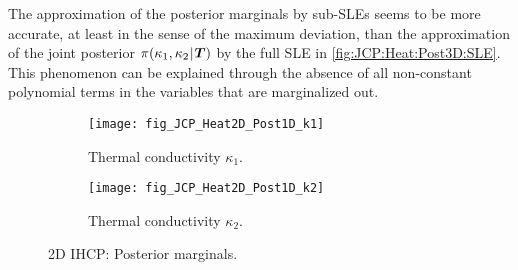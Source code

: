 The approximation of the posterior marginals by sub-SLEs seems to be more accurate, at least in the sense of the maximum deviation,
than the approximation of the joint posterior \(\pi(\kappa_1,\kappa_2 {\:\!}|{\:\!} \bm{T})\) by the full SLE in \cref{fig:JCP:Heat:Post3D:SLE}.
This phenomenon can be explained through the absence of all non-constant polynomial terms in the variables that are marginalized out.
\begin{figure}[htbp]
  \centering
  \begin{subfigure}[b]{\JCPsubWidth}
    \centering
    \texttt{[image: fig\_JCP\_Heat2D\_Post1D\_k1]}
    \caption{Thermal conductivity \(\kappa_1\).}
    \label{fig:JCP:Heat:Post1D:k1}
  \end{subfigure}\hfill%
  \begin{subfigure}[b]{\JCPsubWidth}
    \centering
    \texttt{[image: fig\_JCP\_Heat2D\_Post1D\_k2]}
    \caption{Thermal conductivity \(\kappa_2\).}
    \label{fig:JCP:Heat:Post1D:k2}
  \end{subfigure}%
  \caption[2D IHCP: Posterior marginals]{2D IHCP: Posterior marginals.}
  \label{fig:JCP:Heat:Post1D}
\end{figure}

